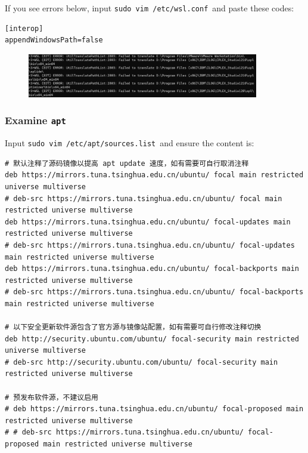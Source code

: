 \documentclass[12pt]{ctexart}
\begin{document}
If you see errors below, input \texttt{sudo\ vim\ /etc/wsl.conf}\ and
paste these codes:

\begin{adjustwidth}{2em}{0pt}
\begin{verbatim}
[interop]
appendWindowsPath=false
\end{verbatim}
\end{adjustwidth}

\begin{figure}[H]
    \centering
    \includegraphics[width=0.9\textwidth,keepaspectratio]{assets/Linux/2.3 I upgraded alone/5.png}
\end{figure}


\subsubsection{\textbf{Examine} \texttt{apt}}

Input \texttt{sudo\ vim\ /etc/apt/sources.list}\ and ensure the content
is:

\fontsize{7}{9}
\begin{adjustwidth}{2em}{0pt}
\begin{verbatim}
# 默认注释了源码镜像以提高 apt update 速度，如有需要可自行取消注释
deb https://mirrors.tuna.tsinghua.edu.cn/ubuntu/ focal main restricted universe multiverse
# deb-src https://mirrors.tuna.tsinghua.edu.cn/ubuntu/ focal main restricted universe multiverse
deb https://mirrors.tuna.tsinghua.edu.cn/ubuntu/ focal-updates main restricted universe multiverse
# deb-src https://mirrors.tuna.tsinghua.edu.cn/ubuntu/ focal-updates main restricted universe multiverse
deb https://mirrors.tuna.tsinghua.edu.cn/ubuntu/ focal-backports main restricted universe multiverse
# deb-src https://mirrors.tuna.tsinghua.edu.cn/ubuntu/ focal-backports main restricted universe multiverse

# 以下安全更新软件源包含了官方源与镜像站配置，如有需要可自行修改注释切换
deb http://security.ubuntu.com/ubuntu/ focal-security main restricted universe multiverse
# deb-src http://security.ubuntu.com/ubuntu/ focal-security main restricted universe multiverse

# 预发布软件源，不建议启用
# deb https://mirrors.tuna.tsinghua.edu.cn/ubuntu/ focal-proposed main restricted universe multiverse
# # deb-src https://mirrors.tuna.tsinghua.edu.cn/ubuntu/ focal-proposed main restricted universe multiverse
\end{verbatim}
\end{adjustwidth}
\fontsize{12}{14}
\end{document}
